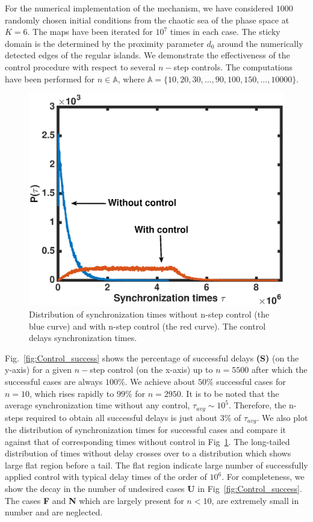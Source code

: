 \documentclass[reprint,superscriptaddress,amsmath,amssymb,aps,pre]{revtex4-1}
\begin{document}
For the numerical implementation of the mechanism, we have considered $1000$ randomly chosen initial conditions from the chaotic sea of the phase space at $K = 6$. The maps have been iterated for $10^7$ times in each case.  The sticky domain is the determined by the proximity parameter $d_0$ around the numerically detected edges of the regular islands. We demonstrate the effectiveness of the control procedure  with respect to several $n-$step controls. The computations have been performed for $n \in \mathbb{A}$, where $\mathbb{A} = \{10, 20,30,...,90, 100, 150, ... ,10 000\}$.  

\begin{figure}[t]
	\includegraphics[scale=0.45]{Sync_time_dist.eps}
	\caption{\label{fig:Sync_time_dist}\footnotesize Distribution of 
		synchronization times without n-step control (the blue curve) and with 
		n-step 
		control (the red curve). The control delays synchronization times. }
\end{figure}


Fig.~\ref{fig:Control_success} shows the percentage of successful delays 
\textbf{(S)} (on the y-axis) for a given $n-$step control (on the x-axis) up 
to $n = 5500$ after which the successful cases are always $100\%$.  We achieve 
about $50\%$ successful cases for $n = 10$, which rises rapidly to $99\%$ for 
$n = 2950$. It is to be noted that the average synchronization time without 
any control, $\tau_{avg} \sim 10^5$. Therefore, the n-steps required to obtain 
all successful delays is just about $3\%$ of $\tau_{avg}$. We also plot the 
distribution of synchronization times for successful cases and compare it 
against that of corresponding times without control in 
Fig~\ref{fig:Sync_time_dist}. The long-tailed 
distribution of times without delay crosses over to a distribution which shows 
large flat region before a tail. The flat region indicate large number of 
successfully applied control with typical delay times of the order of $10^6$. 
For completeness, we show the decay in the number of undesired cases 
\textbf{U} in Fig~\ref{fig:Control_success}.  The cases \textbf{F} and 
\textbf{N} which are largely present for $n<10$, are extremely small in number 
and are neglected.
\end{document}
